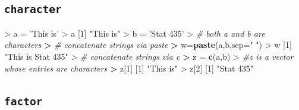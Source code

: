 \documentclass[]{article}
\newenvironment{Shaded}{\begin{snugshade}}{\end{snugshade}}
\newcommand{\KeywordTok}[1]{\textcolor[rgb]{0.13,0.29,0.53}{\textbf{{#1}}}}
\newcommand{\DataTypeTok}[1]{\textcolor[rgb]{0.13,0.29,0.53}{{#1}}}
\newcommand{\DecValTok}[1]{\textcolor[rgb]{0.00,0.00,0.81}{{#1}}}
\newcommand{\StringTok}[1]{\textcolor[rgb]{0.31,0.60,0.02}{{#1}}}
\newcommand{\CommentTok}[1]{\textcolor[rgb]{0.56,0.35,0.01}{\textit{{#1}}}}
\newcommand{\ErrorTok}[1]{\textcolor[rgb]{0.64,0.00,0.00}{\textbf{{#1}}}}
\newcommand{\NormalTok}[1]{{#1}}
\begin{document}
\subsection{\texorpdfstring{\texttt{character}}{character}}\label{character}

\begin{Shaded}
\begin{Highlighting}[]
\NormalTok{>}\StringTok{ }\NormalTok{a =}\StringTok{ 'This is'}
\NormalTok{>}\StringTok{ }\NormalTok{a}
\NormalTok{[}\DecValTok{1}\NormalTok{] }\StringTok{"This is"}
\NormalTok{>}\StringTok{ }\NormalTok{b =}\StringTok{ 'Stat 435'}
\NormalTok{>}\StringTok{ }\CommentTok{# both a and b are characters}
\ErrorTok{>}\StringTok{ }\CommentTok{# concatenate strings via paste}
\ErrorTok{>}\StringTok{ }\NormalTok{w=}\KeywordTok{paste}\NormalTok{(a,b,}\DataTypeTok{sep=}\StringTok{" "}\NormalTok{)}
\NormalTok{>}\StringTok{ }\NormalTok{w}
\NormalTok{[}\DecValTok{1}\NormalTok{] }\StringTok{"This is Stat 435"}
\NormalTok{>}\StringTok{ }\CommentTok{# concatenate strings via c}
\ErrorTok{>}\StringTok{ }\NormalTok{z =}\StringTok{ }\KeywordTok{c}\NormalTok{(a,b)}
\NormalTok{>}\StringTok{ }\CommentTok{#z is a vector whose entries are characters}
\ErrorTok{>}\StringTok{ }\NormalTok{z[}\DecValTok{1}\NormalTok{]}
\NormalTok{[}\DecValTok{1}\NormalTok{] }\StringTok{"This is"}
\NormalTok{>}\StringTok{ }\NormalTok{z[}\DecValTok{2}\NormalTok{]}
\NormalTok{[}\DecValTok{1}\NormalTok{] }\StringTok{"Stat 435"}
\end{Highlighting}
\end{Shaded}

\subsection{\texorpdfstring{\texttt{factor}}{factor}}\label{factor}
\end{document}
